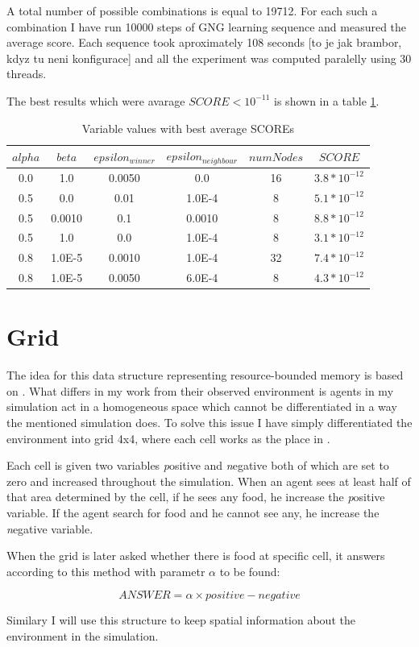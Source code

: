 A total number of possible combinations is equal to 19712. For each such a combination I have run 10000 steps of GNG learning sequence and measured the average score. Each sequence took aproximately 108 seconds [to je jak brambor, kdyz tu neni konfigurace] and all the experiment was computed paralelly using 30 threads.

The best results which were avarage $SCORE < 10^{-11}$ is shown in a table \ref{usedalgo:gngexperimentresults}.

\begin{table}
\begin{center}
\begin{tabular}{ccccc|c}

$alpha$ & $beta$ & $epsilon_{winner}$ & $epsilon_{neighbour}$ & $numNodes$ & $SCORE$ \\
\hline
0.0 & 1.0 & 0.0050 & 0.0 & 16 & $3.8*10^{-12}$ \\
0.5 & 0.0 & 0.01 & 1.0E-4 & 8 & $5.1*10^{-12}$ \\   
0.5 & 0.0010 & 0.1 & 0.0010 & 8 & $8.8*10^{-12}$ \\ 
0.5 & 1.0 & 0.0 & 1.0E-4 & 8 & $3.1*10^{-12}$ \\     
0.8 & 1.0E-5 & 0.0010 & 1.0E-4 & 32 & $7.4*10^{-12}$ \\
0.8 & 1.0E-5 & 0.0050 & 6.0E-4 & 8 & $4.3*10^{-12}$ \\

\end{tabular}      
\caption{\label{usedalgo:gngexperimentresults}Variable values with best average SCOREs}
\end{center}
\end{table}

\section{Grid}
\label{sec:grid}

The idea for this data structure representing resource-bounded memory is based on \cite{Brom:placeandobjects}. What differs in my work from their observed environment is agents in my simulation act in a homogeneous space which cannot be differentiated in a way the mentioned simulation does. To solve this issue I have simply differentiated the environment into grid 4x4, where each cell works as the place in \cite{Brom:placeandobjects}. 

Each cell is given two variables {\emph positive} and {\emph negative} both of which are set to zero and increased throughout the simulation. When an agent sees at least half of that area determined by the cell, if he sees any food, he increase the {\emph positive} variable. If the agent search for food and he cannot see any, he increase the {\emph negative} variable.

When the grid is later asked whether there is food at specific cell, it answers according to this method with parametr $\alpha$ to be found:

\begin{equation} ANSWER = \alpha\times positive - negative 
\end{equation}
 
Similary I will use this structure to keep spatial information about the environment in the simulation.
